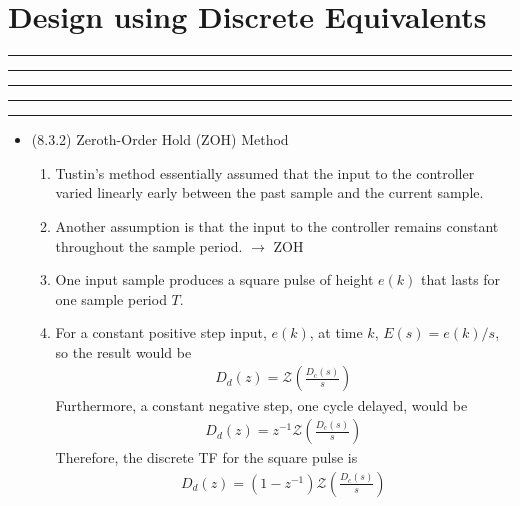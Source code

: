 \setcounter{chapter}{7}
\setcounter{section}{2}
\section{Design using Discrete Equivalents}
\vspace{-8pt} \hrule \hrule \hrule \hrule \hrule  \vspace{12pt}

\begin{itemize}
	\item (8.3.2) Zeroth-Order Hold (ZOH) Method 
	\begin{enumerate}
		\item Tustin's method essentially assumed that the input to the controller varied linearly early between the past sample  and the current sample. 
		\item Another assumption is that the input to the controller remains constant throughout the sample period.  $\rightarrow$ ZOH 
		\item One input sample produces a square pulse of height $e(k)$ that lasts for one sample period $T$. 
		\item For a constant positive step input, $e(k)$, at time $k$, $E(s) = e(k)/s$, so the result would be
		\begin{align*}
			D_d(z) = \mathcal{Z} \left( \frac{D_c(s)}{s} \right)
		\end{align*}
		Furthermore, a constant negative step, one cycle delayed, would be 
		\begin{align*}
			D_d(z) = z^{-1} \mathcal{Z} \left( \frac{D_c(s)}{s} \right)
		\end{align*}
		Therefore, the discrete TF for the square pulse is 
		\begin{align*}
			D_d(z) = (1-z^{-1}) \mathcal{Z} \left( \frac{D_c(s)}{s} \right)
		\end{align*}	
	\end{enumerate}
\end{itemize}